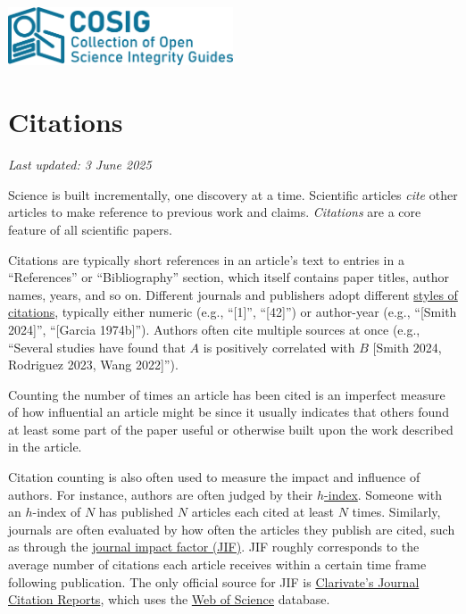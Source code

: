 \documentclass[letterpaper, 12pt]{article}
\begin{document}
\flushleft
\includegraphics[width=0.5\textwidth]{img/home/241017_final_logo_mockup.png}

\section*{Citations}
\textit{Last updated: 3 June 2025}

Science is built incrementally, one discovery at a time.
Scientific articles \emph{cite} other articles to make reference to previous work and claims.
\emph{Citations} are a core feature of all scientific papers.

Citations are typically short references in an article's text to entries in a ``References'' or ``Bibliography'' section,
which itself contains paper titles, author names, years, and so on.
Different journals and publishers adopt different \href{https://libguides.brown.edu/citations/styles}{styles of citations}, typically either numeric (e.g., ``[1]'', ``[42]'')
or author-year (e.g., ``[Smith 2024]'', ``[Garcia 1974b]''). Authors often cite multiple sources at once (e.g., ``Several studies have found that $A$ is positively correlated with $B$ [Smith 2024, Rodriguez 2023, Wang 2022]'').

Counting the number of times an article has been cited is an imperfect measure of how influential an article might be since it usually indicates that others found at least some part of the paper useful or otherwise built upon the work described in the article.

Citation counting is also often used to measure the impact and influence of authors. For instance, authors are often judged by their \href{https://doi.org/10.1073%2Fpnas.0507655102}{$h$-index}.
Someone with an $h$-index of $N$ has published $N$ articles each cited at least $N$ times. Similarly, journals are often evaluated by how often the articles they publish are cited, such as through the \href{https://doi.org/10.1001%2Fjama.295.1.90}{journal impact factor (JIF)}. JIF roughly corresponds to the average number of citations each article receives within a certain time frame following publication. The only official source for JIF is \href{https://clarivate.com/academia-government/scientific-and-academic-research/research-funding-analytics/journal-citation-reports/}{Clarivate's Journal Citation Reports}, which uses the \href{https://clarivate.com/academia-government/scientific-and-academic-research/research-discovery-and-referencing/web-of-science/}{Web of Science} database.
\end{document}
